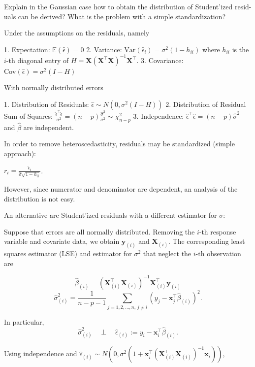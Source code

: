Explain in the Gaussian case how to obtain the distribution of Student’ized resid-
uals can be derived? What is the problem with a simple standardization?

Under the assumptions on the residuals, namely

1. Expectation: \(\mathbb{E}(\hat{\epsilon}) = 0\)
2. Variance: \(\text{Var}(\hat{\epsilon}_i) = \sigma^2 (1 - h_{ii})\) where \(h_{ii}\) is the \(i\)-th diagonal entry of \(H = \mathbf{X}(\mathbf{X}^\top \mathbf{X})^{-1} \mathbf{X}^\top\).
3. Covariance: \(\text{Cov}(\hat{\epsilon}) = \sigma^2 (I - H)\)

With normally distributed errors

1. Distribution of Residuals: \(\hat{\epsilon} \sim N(0, \sigma^2 (I - H))\)
2. Distribution of Residual Sum of Squares: \(\frac{\hat{\epsilon}^\top \hat{\epsilon}}{\sigma^2} = (n - p) \frac{\hat{\sigma}^2}{\sigma^2} \sim \chi^2_{n - p}\)
3. Independence: \(\hat{\epsilon}^\top \hat{\epsilon} = (n - p) \hat{\sigma}^2\) and \(\hat{\beta}\) are independent.

In order to remove heteroscedasticity, residuals may be standardized (simple approach): 

\( r_i = \frac{\hat{\epsilon}_i}{\hat{\sigma} \sqrt{1 - h_{ii}}} \).

However, since numerator and denominator are dependent, an analysis of the distribution is not easy.

An alternative are Student'ized residuals with a different estimator for \(\sigma\):

Suppose that errors are all normally distributed.
Removing the \(i\)-th response variable and covariate data, we obtain \(\mathbf{y}_{(i)}\) and \(\mathbf{X}_{(i)}\).
The corresponding least squares estimator (LSE) and estimator for \(\sigma^2\) that neglect the \(i\)-th observation are

\[
\hat{\beta}_{(i)} = \left( \mathbf{X}_{(i)}^\top \mathbf{X}_{(i)} \right)^{-1} \mathbf{X}_{(i)}^\top \mathbf{y}_{(i)}
\]
\[
\hat{\sigma}^2_{(i)} = \frac{1}{n - p - 1} \sum_{j = 1, 2, \ldots, n, \, j \neq i} \left( y_j - \mathbf{x}_j^\top \hat{\beta}_{(i)} \right)^2.
\]

In particular,
\[
\hat{\sigma}^2_{(i)} \quad \perp \quad \hat{\epsilon}_{(i)} := y_i - \mathbf{x}_i^\top \hat{\beta}_{(i)}.
\]

Using independence and 
\(\hat{\epsilon}_{(i)} \sim N \left(0, \sigma^2 \left(1 + \mathbf{x}_i^\top \left( \mathbf{X}_{(i)}^\top \mathbf{X}_{(i)} \right)^{-1} \mathbf{x}_i \right)\right)\),


